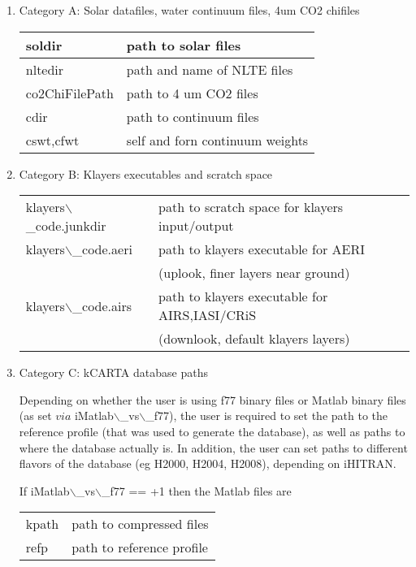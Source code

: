 \documentclass[11pt]{article}
\begin{document}
\begin{enumerate}
\item Category A: Solar datafiles, water continuum files, 4um CO2 chifiles
\label{sec-3-1-0-1}

\begin{center}
\begin{tabular}{ll}
soldir & path to solar files\\
\hline
nltedir & path and name of NLTE files\\
co2ChiFilePath & path to 4 um CO2 files\\
cdir & path to continuum files\\
cswt,cfwt & self and forn continuum weights\\
\end{tabular}
\end{center}

\item Category B: Klayers executables and scratch space
\label{sec-3-1-0-2}

\begin{center}
\begin{tabular}{ll}
klayers$\backslash$\_code.junkdir & path to scratch space for klayers input/output\\
klayers$\backslash$\_code.aeri & path to klayers executable for AERI\\
 & (uplook, finer layers near ground)\\
klayers$\backslash$\_code.airs & path to klayers executable for AIRS,IASI/CRiS\\
 & (downlook, default klayers layers)\\
\end{tabular}
\end{center}

\item Category C: kCARTA database paths
\label{sec-3-1-0-3}

Depending on whether the user is using f77 binary files or Matlab binary
files (as set \(via\) iMatlab$\backslash$\_vs$\backslash$\_f77), the user is required to set the
path to the reference profile (that was used to generate the database),
as well as paths to where the database actually is. In addition, the
user can set paths to different flavors of the database (eg H2000,
H2004, H2008), depending on iHITRAN.

If iMatlab$\backslash$\_vs$\backslash$\_f77 == +1 then the Matlab files are

\begin{center}
\begin{tabular}{ll}
kpath & path to compressed files\\
refp & path to reference profile\\
\end{tabular}
\end{center}


\end{enumerate}
\end{document}
